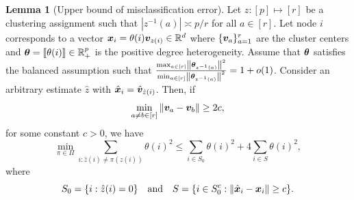 \documentclass[lettersize,journal]{IEEEtran}
\theoremstyle{definition}
\newtheorem{lem}{Lemma}
\theoremstyle{definition}
\begin{document}
\begin{lem}[Upper bound of misclassification error]\label{lem:upper_mis} Let $z: [p] \mapsto [r]$ be a clustering assignment such that $|z^{-1}(a)| \asymp p/r$ for all $a \in [r]$. Let node $i$ corresponds to a vector $\bm x_i  = \theta(i) \bm{v}_{z(i)} \in \mathbb{R}^d$ where $\{\bm{v}_a\}_{a = 1}^r$ are the cluster centers and $\boldsymbol{\theta} = \llbracket \theta(i) \rrbracket \in \mathbb{R}^p_+$ is the positive degree heterogeneity. Assume that  $\boldsymbol{\theta}$ satisfies the balanced assumption such that ${\max_{a \in [r]} \left\lVert\boldsymbol{\theta}_{z^{-1}(a)}\right\rVert^2 \over \min_{a \in [r]} \left\lVert\boldsymbol{\theta}_{z^{-1}(a)}\right\rVert^2 }= 1 + o(1)$. Consider an arbitrary estimate $\hat z$ with $\hat {\bm x}_i = \hat {\bm{v}}_{\hat z(i)}$. Then, if
\begin{equation}
    \min_{a \neq b \in [r]} \left\lVert\bm{v}_a - \bm{v}_b\right\rVert \geq 2c,
\end{equation}
 for some constant $c >0$, we have 
\begin{equation}
    \min_{\pi \in \Pi} \sum_{i : \hat z(i) \neq \pi(z(i))} \theta(i)^2 \leq \sum_{i \in S_0} \theta(i)^2 + 4 \sum_{i \in S} \theta(i)^2,
\end{equation}
where 
\begin{equation}
    S_0 = \{i: \hat z(i) = 0\} \quad  \text{and}  \quad S = \{i \in S_0^c: \left\lVert\hat {\bm x}_i - \bm x_i \right\rVert \geq c \}.
\end{equation}

\end{lem}
\end{document}
